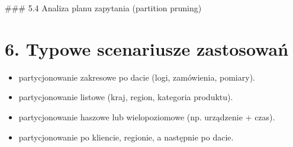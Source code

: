\documentclass[a4paper,11pt,polish]{sphinxmanual}
\begin{document}
\sphinxAtStartPar
\#\#\# 5.4 Analiza planu zapytania (partition pruning)

\begin{sphinxVerbatim}[commandchars=\\\{\}]

\end{sphinxVerbatim}


\section{6. Typowe scenariusze zastosowań}
\label{\detokenize{rozdzial_1:typowe-scenariusze-zastosowan}}\begin{itemize}
\item {} 
\sphinxAtStartPar
{} partycjonowanie zakresowe po dacie (logi, zamówienia, pomiary).

\item {} 
\sphinxAtStartPar
{} partycjonowanie listowe (kraj, region, kategoria produktu).

\item {} 
\sphinxAtStartPar
{} partycjonowanie haszowe lub wielopoziomowe (np. urządzenie + czas).

\item {} 
\sphinxAtStartPar
{} partycjonowanie po kliencie, regionie, a następnie po dacie.

\end{itemize}
\end{document}
